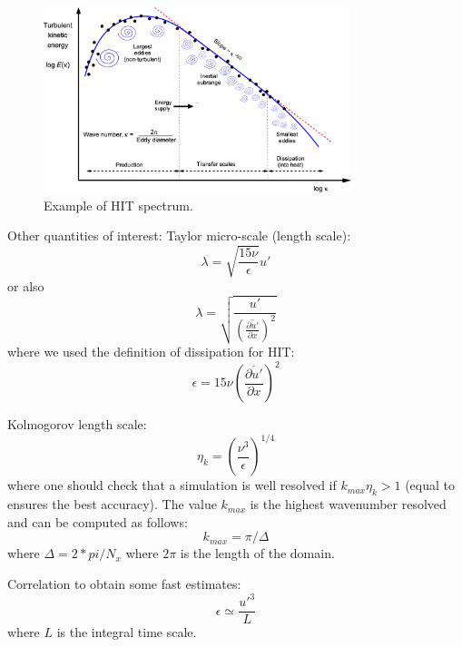 \documentclass[11pt]{article}
\begin{document}
\begin{figure}[!t]
\centering
    \includegraphics[width=0.8\textwidth]{spectra.png} 
    \caption{Example of HIT spectrum.}
    \label{spectra}
\end{figure}

\noindent
Other quantities of interest:
Taylor micro-scale (length scale):
\begin{equation}
\lambda=\sqrt{\frac{15 \nu}{\epsilon}} u'
\end{equation}
or also 
\begin{equation}
\lambda=\sqrt{\frac{u'}{  \left(  \overline{ \frac{\partial u'}{ \partial  x} } \right)^2}}
\end{equation}
where we used the definition of dissipation for HIT:
\begin{equation}
\epsilon=15 \nu  \left(  \overline{ \frac{\partial u'}{ \partial  x} } \right)^2
\end{equation}

\noindent
Kolmogorov length scale:
\begin{equation}
\eta_k = \left( \frac{\nu^3 }{\epsilon} \right)^{1/4}
\end{equation}
where one should check that a simulation is well resolved if $k_{max} \eta_k > 1$ (equal to ensures the best accuracy).
The value $k_{max}$ is the highest wavenumber resolved and can be computed as follows:
\begin{equation}
k_{max}= \pi / \Delta
\end{equation}
where $\Delta = 2*pi / N_x$ where $2 \pi$ is the length of the domain.

\noindent
Correlation to obtain some fast estimates:
\begin{equation}
\epsilon \simeq \frac{u'^3}{L}
\end{equation}
where $L$ is the integral time scale.
\end{document}
